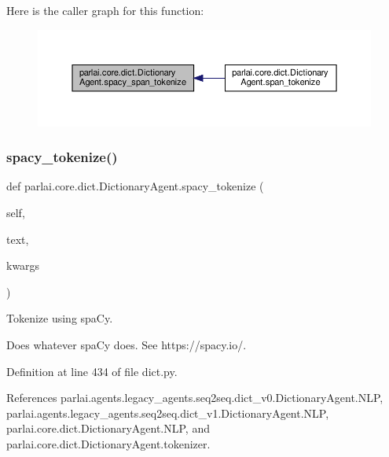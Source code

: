 Here is the caller graph for this function\+:
\nopagebreak
\begin{figure}[H]
\begin{center}
\leavevmode
\includegraphics[width=350pt]{classparlai_1_1core_1_1dict_1_1DictionaryAgent_a6532e92a69be5a68d04963597cd4ba29_icgraph}
\end{center}
\end{figure}
\mbox{\label{classparlai_1_1core_1_1dict_1_1DictionaryAgent_a8e818ad5e11ecb08de6c4b858b2e68f1}} 
\subsubsection{\texorpdfstring{spacy\+\_\+tokenize()}{spacy\_tokenize()}}
{\footnotesize\ttfamily def parlai.\+core.\+dict.\+Dictionary\+Agent.\+spacy\+\_\+tokenize (\begin{DoxyParamCaption}\item[{}]{self,  }\item[{}]{text,  }\item[{}]{kwargs }\end{DoxyParamCaption})}

\begin{DoxyVerb}Tokenize using spaCy.

Does whatever spaCy does. See https://spacy.io/.
\end{DoxyVerb}
 

Definition at line 434 of file dict.\+py.



References parlai.\+agents.\+legacy\+\_\+agents.\+seq2seq.\+dict\+\_\+v0.\+Dictionary\+Agent.\+N\+LP, parlai.\+agents.\+legacy\+\_\+agents.\+seq2seq.\+dict\+\_\+v1.\+Dictionary\+Agent.\+N\+LP, parlai.\+core.\+dict.\+Dictionary\+Agent.\+N\+LP, and parlai.\+core.\+dict.\+Dictionary\+Agent.\+tokenizer.

